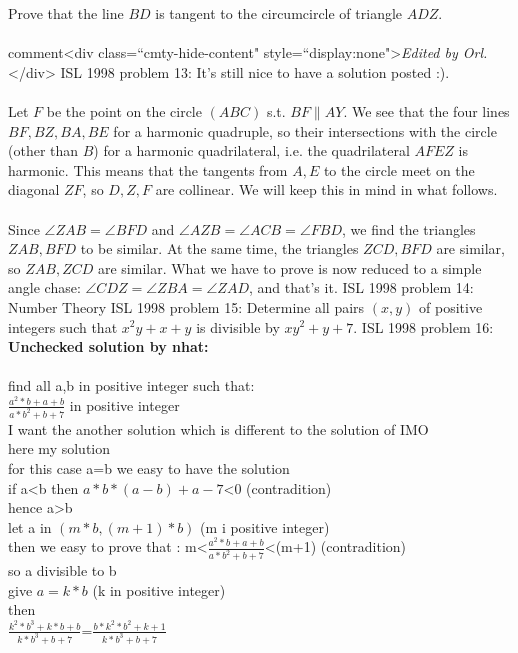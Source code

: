 Prove that the line $BD$ is tangent to the circumcircle of triangle $ADZ$. \\\\
comment<div class=``cmty-hide-content" style=``display:none">\textit{Edited by Orl.}</div> 
ISL 1998 problem 13:  It's still nice to have a solution posted :). \\\\
Let $F$ be the point on the circle $(ABC)$ s.t. $BF\|AY$. We see that the four lines $BF,BZ,BA,BE$ for a harmonic quadruple, so their intersections with the circle (other than $B$) for a harmonic quadrilateral, i.e. the quadrilateral $AFEZ$ is harmonic. This means that the tangents from $A,E$ to the circle meet on the diagonal $ZF$, so $D,Z,F$ are collinear. We will keep this in mind in what follows. \\\\
Since $\angle ZAB=\angle BFD$ and $\angle AZB=\angle ACB=\angle FBD$, we find the triangles $ZAB,BFD$ to be similar. At the same time, the triangles $ZCD,BFD$ are similar, so $ZAB,ZCD$ are similar. What we have to prove is now reduced to a simple angle chase: $\angle CDZ=\angle ZBA=\angle ZAD$, and that's it. 
ISL 1998 problem 14:  Number Theory 
ISL 1998 problem 15:  Determine all pairs $(x,y)$ of positive integers such that $x^2y+x+y$ is divisible by $xy^2+y+7$. 
ISL 1998 problem 16:  \textbf{Unchecked solution by nhat:} \\\\
find all a,b in positive integer such that: \\
$\frac {a^2*b+a+b}{a*b^2+b+7}$ in positive integer \\
I want the another solution which is different to the solution of IMO \\
here my solution \\
for this case a=b we easy to have the solution \\
if a<b then $a*b*(a-b)+a-7$<0 (contradition) \\
hence a>b \\
let a in $(m*b,(m+1)*b)$ (m i  positive integer) \\
then we easy to prove that :  m<$\frac {a^2*b+a+b}{a*b^2+b+7}$<(m+1) (contradition) \\
so a divisible to b \\
give $a=k*b$  (k in positive integer) \\
then \\
$\frac{k^2*b^3+k*b+b}{k*b^3+b+7}$=$\frac{b*{k^2*b^2+k+1}}{k*b^3+b+7}$ \\
